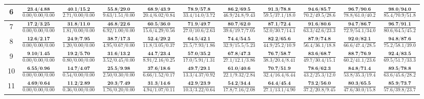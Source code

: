 \documentclass{slides}
\begin{document}
{{{\begin{tabular}{|c|c|c|c|c|c|c|c|c|c|c|}
\hline
6 & $\frac{\textbf{23.4/4.88}}{0.00/0.00/0.00}$ & $\frac{\textbf{40.1/15.2}}{2.71/0.00/0.00}$ & $\frac{\textbf{55.8/29.0}}{9.63/1.51/0.00}$ & $\frac{\textbf{68.9/43.9}}{20.4/6.02/0.84}$ & $\frac{\textbf{78.9/57.8}}{33.4/14.0/3.72}$ & $\frac{\textbf{86.2/69.5}}{46.9/24.8/9.43}$ & $\frac{\textbf{91.3/78.8}}{59.5/37.1/18.0}$ & $\frac{\textbf{94.6/85.7}}{70.2/49.5/28.6}$ & $\frac{\textbf{96.7/90.6}}{78.8/61.0/40.2}$ & $\frac{\textbf{98.0/94.0}}{85.4/70.9/51.8}$ \\
\hline
7 & $\frac{\textbf{17.2/3.25}}{0.00/0.00/0.00}$ & $\frac{\textbf{31.8/11.0}}{1.81/0.00/0.00}$ & $\frac{\textbf{46.8/22.6}}{6.92/1.00/0.00}$ & $\frac{\textbf{60.5/36.0}}{15.6/4.29/0.56}$ & $\frac{\textbf{71.9/49.7}}{27.0/10.6/2.63}$ & $\frac{\textbf{80.7/62.0}}{39.6/19.7/7.05}$ & $\frac{\textbf{87.1/72.4}}{52.0/30.7/14.1}$ & $\frac{\textbf{91.6/80.6}}{63.3/42.6/23.3}$ & $\frac{\textbf{94.7/86.7}}{72.9/54.1/34.0}$ & $\frac{\textbf{96.7/91.1}}{80.6/64.5/45.2}$ \\
\hline
8 & $\frac{\textbf{12.6/2.17}}{0.00/0.00/0.00}$ & $\frac{\textbf{24.9/7.95}}{1.20/0.00/0.00}$ & $\frac{\textbf{38.7/17.3}}{4.95/0.67/0.00}$ & $\frac{\textbf{52.4/29.2}}{11.8/3.05/0.37}$ & $\frac{\textbf{64.5/42.1}}{21.5/7.93/1.86}$ & $\frac{\textbf{74.4/54.5}}{32.9/15.5/5.23}$ & $\frac{\textbf{82.2/65.6}}{44.9/25.2/10.9}$ & $\frac{\textbf{87.9/74.8}}{56.4/36.1/18.8}$ & $\frac{\textbf{92.0/82.1}}{66.6/47.4/28.5}$ & $\frac{\textbf{94.8/87.6}}{75.2/58.1/39.0}$ \\
\hline
9 & $\frac{\textbf{9.10/1.45}}{0.00/0.00/0.00}$ & $\frac{\textbf{19.2/5.70}}{0.80/0.00/0.00}$ & $\frac{\textbf{31.6/13.2}}{3.52/0.45/0.00}$ & $\frac{\textbf{44.7/23.4}}{8.91/2.16/0.25}$ & $\frac{\textbf{57.0/35.2}}{17.0/5.91/1.31}$ & $\frac{\textbf{67.8/47.3}}{27.1/12.1/3.86}$ & $\frac{\textbf{76.7/58.7}}{38.3/20.4/8.41}$ & $\frac{\textbf{83.6/68.7}}{49.7/30.4/15.1}$ & $\frac{\textbf{88.7/76.9}}{60.2/41.1/23.6}$ & $\frac{\textbf{92.4/83.5}}{69.5/51.7/33.3}$ \\
\hline
10 & $\frac{\textbf{6.55/0.96}}{0.00/0.00/0.00}$ & $\frac{\textbf{14.7/4.07}}{0.54/0.00/0.00}$ & $\frac{\textbf{25.5/9.98}}{2.50/0.30/0.00}$ & $\frac{\textbf{37.6/18.6}}{6.66/1.52/0.17}$ & $\frac{\textbf{49.7/29.1}}{13.3/4.37/0.92}$ & $\frac{\textbf{61.0/40.6}}{22.1/9.32/2.84}$ & $\frac{\textbf{70.7/51.9}}{32.4/16.4/6.44}$ & $\frac{\textbf{78.6/62.3}}{43.2/25.3/12.0}$ & $\frac{\textbf{84.8/71.4}}{53.8/35.3/19.4}$ & $\frac{\textbf{89.5/78.8}}{63.6/45.6/28.2}$ \\
\hline
11 & $\frac{\textbf{4.69/0.64}}{0.00/0.00/0.00}$ & $\frac{\textbf{11.2/2.89}}{0.36/0.00/0.00}$ & $\frac{\textbf{20.3/7.49}}{1.76/0.20/0.00}$ & $\frac{\textbf{31.3/14.6}}{4.94/1.07/0.11}$ & $\frac{\textbf{42.9/23.9}}{10.3/3.22/0.64}$ & $\frac{\textbf{54.2/34.4}}{17.8/7.16/2.08}$ & $\frac{\textbf{64.4/45.4}}{27.1/13.1/4.90}$ & $\frac{\textbf{73.2/56.0}}{37.2/20.8/9.45}$ & $\frac{\textbf{80.3/65.5}}{47.6/30.0/15.8}$ & $\frac{\textbf{85.9/73.7}}{57.6/39.8/23.7}$ \\

\end{tabular}}}}
\end{document}
